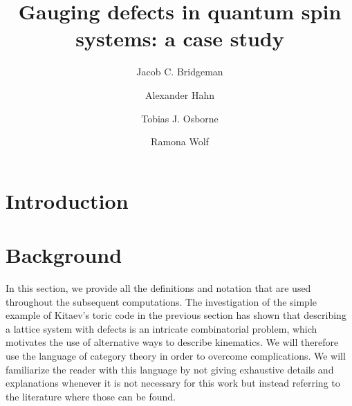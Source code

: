 




\title{Gauging defects in quantum spin systems: a case study}


\author{Jacob C. Bridgeman}
\author{Alexander Hahn}
\author{Tobias J. Osborne}
\author{Ramona Wolf}

                            

\begin{abstract}

\end{abstract}


\maketitle

\section{Introduction}


\section{Background}\label{S:defs}
In this section, we provide all the definitions and notation that are used throughout the subsequent computations. The investigation of the simple example of Kitaev’s toric code in the previous section has shown that describing a lattice system with defects is an intricate combinatorial problem, which motivates the use of alternative ways to describe kinematics. We will therefore use the language of category theory in order to overcome complications. We will familiarize the reader with this language by not giving exhaustive details and explanations whenever it is not necessary for this work but instead referring to the literature where those can be found.

